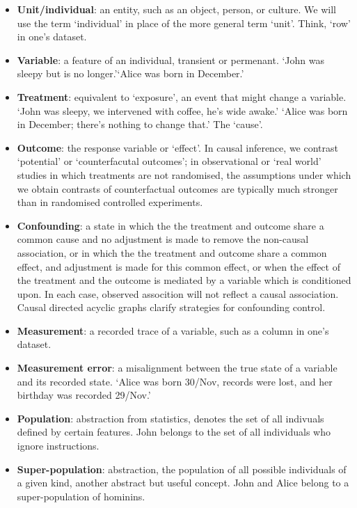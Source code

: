 \documentclass[
  single column]{article}
\begin{document}
\begin{itemize}
\item
  \textbf{Unit/individual}: an entity, such as an object, person, or
  culture. We will use the term `individual' in place of the more
  general term `unit'. Think, `row' in one's dataset.
\item
  \textbf{Variable}: a feature of an individual, transient or permenant.
  `John was sleepy but is no longer.'`Alice was born in December.'
\item
  \textbf{Treatment}: equivalent to `exposure', an event that might
  change a variable. `John was sleepy, we intervened with coffee, he's
  wide awake.' `Alice was born in December; there's nothing to change
  that.' The `cause'.
\item
  \textbf{Outcome}: the response variable or `effect'. In causal
  inference, we contrast `potential' or `counterfacutal outcomes'; in
  observational or `real world' studies in which treatments are not
  randomised, the assumptions under which we obtain contrasts of
  counterfactual outcomes are typically much stronger than in randomised
  controlled experiments.
\item
  \textbf{Confounding}: a state in which the the treatment and outcome
  share a common cause and no adjustment is made to remove the
  non-causal association, or in which the the treatment and outcome
  share a common effect, and adjustment is made for this common effect,
  or when the effect of the treatment and the outcome is mediated by a
  variable which is conditioned upon. In each case, observed assocition
  will not reflect a causal association. Causal directed acyclic graphs
  clarify strategies for confounding control.
\item
  \textbf{Measurement}: a recorded trace of a variable, such as a column
  in one's dataset.
\item
  \textbf{Measurement error}: a misalignment between the true state of a
  variable and its recorded state. `Alice was born 30/Nov, records were
  lost, and her birthday was recorded 29/Nov.'
\item
  \textbf{Population}: abstraction from statistics, denotes the set of
  all indivuals defined by certain features. John belongs to the set of
  all individuals who ignore instructions.
\item
  \textbf{Super-population}: abstraction, the population of all possible
  individuals of a given kind, another abstract but useful concept. John
  and Alice belong to a super-population of hominins.

\end{itemize}
\end{document}
